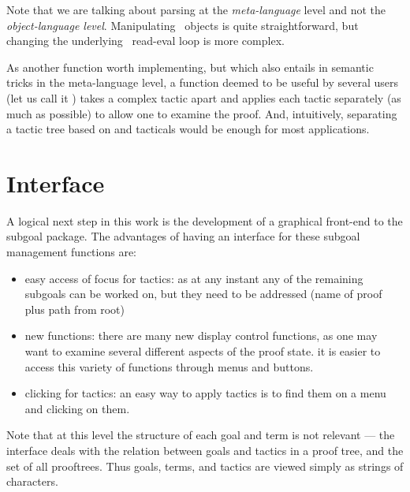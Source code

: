 Note that we are talking about parsing at the {\em meta-language}
level and not the {\em object-language level}. Manipulating \HOL\
objects is quite straightforward, but changing the underlying \ML\
read-eval loop is more complex.

As another function worth implementing, but which also entails in
semantic tricks in the meta-language level, a function deemed to be
useful by several users (let us call it
\ml{single\_tac}) takes a complex tactic apart and applies each
tactic separately (as much as possible) to allow one to examine the
proof. And, intuitively, separating a tactic tree based on 
and \ml{THENL} tacticals would be enough for most applications.


\section{ Interface}

A logical next step in this work is  the development of a graphical
front-end to the subgoal package.
The advantages of having an interface for these subgoal management
functions  are:
\begin{itemize}
\item easy access of focus for tactics: as at any instant any of the
remaining subgoals can be worked on, but they need to be addressed
(name of proof plus path from root)
\item new functions: there are many new display control functions, as
one may want to examine several different aspects of the proof state.
it is easier to access this variety of functions through menus and
buttons.
\item clicking for tactics: an easy way to apply tactics is to find
them on a menu and clicking on them.
\end{itemize}

Note that at this level the structure of each goal and term is not
relevant --- the interface deals with the relation between goals and
tactics in a proof tree, and the set of all prooftrees. Thus goals,
terms, and tactics are viewed simply as strings of characters.

